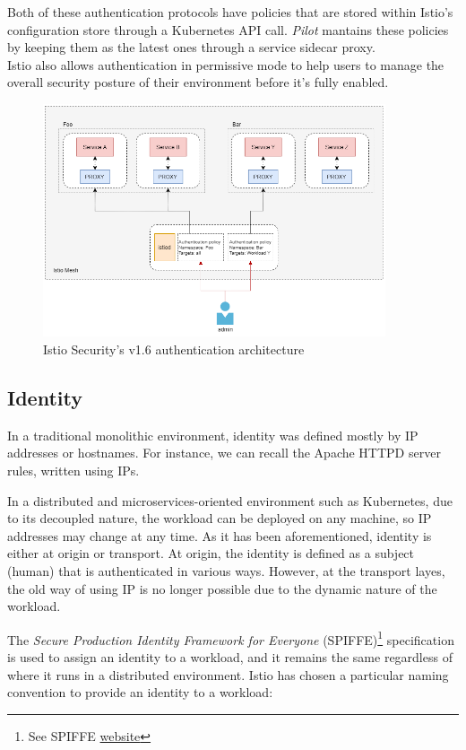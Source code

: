 \noindent Both of these authentication protocols have policies that are stored within Istio's configuration store through a Kubernetes API call. \textit{Pilot} mantains these policies by keeping them as the latest ones through a service sidecar proxy. \\Istio also allows authentication in permissive mode to help users to manage the overall security posture of their environment before it's fully enabled.    

\begin{figure}[ht]
    \centering
    \includegraphics[width=0.9\textwidth]{chapters/images/chp2/arch-auth.png}
    \caption{Istio Security's v1.6 authentication architecture}
    \label{fig:autharc}
\end{figure}

\subsection{Identity}
In a traditional monolithic environment, identity was defined mostly by IP addresses or hostnames. For instance, we can recall the Apache HTTPD server rules, written using IPs.

In a distributed and microservices-oriented environment such as Kubernetes, due to its decoupled nature, the workload can be deployed on any machine, so IP addresses may change at any time. As it has been aforementioned, identity is either at origin or transport. At origin, the identity is defined as a subject (human) that is authenticated in various ways. However, at the transport layes, the old way of using IP is no longer possible due to the dynamic nature of the workload.

The \textit{Secure Production Identity Framework for Everyone} (SPIFFE)\footnote{See SPIFFE \href{https://spiffe.io/}{website}} specification is used to assign an identity to a workload, and it remains the same regardless of where it runs in a distributed environment. Istio has chosen a particular naming convention to provide an identity to a workload:


